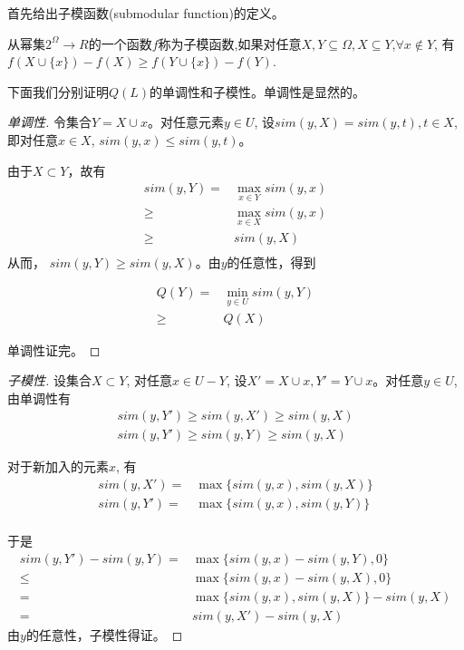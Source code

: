 首先给出子模函数(submodular function)的定义。
\begin{definition}[子模函数]
从幂集$2^\Omega \to R$的一个函数$f$称为子模函数,如果对任意$X,Y \subseteq \Omega, X \subseteq Y$,$\forall x \notin Y$, 有$f(X \cup \{x\} ) - f(X) \geq f(Y \cup \{x\} ) - f(Y)$.
\end{definition}

下面我们分别证明$Q(L)$的单调性和子模性。单调性是显然的。
\begin{proof}[单调性]
令集合$Y=X\cup{x}$。对任意元素$y \in U$, 设$sim(y, X) = sim(y, t), t \in X$, 即对任意$x \in X$, $sim(y,x) \le sim(y,t)$。

由于$X \subset Y$，故有
\begin{align*}
	sim(y,Y) = & \mathop {\max }\limits_{x \in Y} sim(y,x) \\
			\ge &  \mathop {\max }\limits_{x \in X} sim(y,x) \\
			\ge &  sim(y,X) \\
\end{align*}
从而， $sim(y, Y) \ge sim(y, X)$。由$y$的任意性，得到

\begin{align*}
	Q(Y) = & \mathop {\min }\limits_{y \in U} sim(y,Y) \\ 
		\ge & Q(X)
\end{align*}

单调性证完。
\end{proof}

\begin{proof}[子模性]
设集合$X \subset Y$, 对任意$x \in U - Y$, 设$X' = X\cup{x}, Y' = Y\cup{x}$。对任意$y \in U$, 由单调性有
\begin{eqnarray*}
	sim(y, Y') \ge sim(y, X') \ge sim(y, X) \\
	sim(y, Y') \ge sim(y, Y) \ge sim(y, X) 
\end{eqnarray*}

对于新加入的元素$x$, 有
\begin{align*}
	sim(y, X') = & \max\{ sim(y, x), sim(y,X) \} \\
	sim(y, Y') = & \max\{ sim(y, x), sim(y,Y) \} \\
\end{align*}

于是
\begin{align*}
	sim(y, Y') - sim(y, Y) = & \max \{ sim(y, x) - sim(y, Y), 0\} \\
						\le & \max \{ sim(y, x) - sim(y, X), 0 \} \\
						= & \max \{ sim(y, x), sim(y, X) \} - sim(y, X) \\
						= & sim(y, X') - sim(y, X)						
\end{align*}
由$y$的任意性，子模性得证。
\end{proof}

